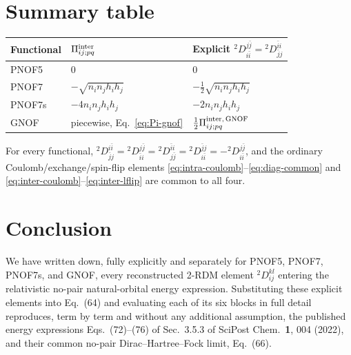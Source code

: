 \documentclass[11pt,a4paper]{article}
\newcommand{\Dtwo}{{}^2D}
\newcommand{\PiMat}{\Pi}
\newcommand{\hi}{h_i}
\newcommand{\hj}{h_j}
\begin{document}
\section{Summary table}
\label{sec:summary}

\begin{center}
\begin{tabular}{@{}lll@{}}
\toprule
Functional & $\PiMat^{\rm inter}_{ij;pq}$ & Explicit $\Dtwo^{j\bar j}_{i\bar i}=\Dtwo^{\bar ii}_{\bar jj}$ \\
\midrule
PNOF5 & $0$ & $0$ \\
PNOF7 & $-\sqrt{n_in_j\hi\hj}$ & $-\tfrac12\sqrt{n_in_j\hi\hj}$ \\
PNOF7s & $-4n_in_j\hi\hj$ & $-2n_in_j\hi\hj$ \\
GNOF & piecewise, Eq.~\eqref{eq:Pi-gnof} & $\tfrac12\PiMat^{\rm inter,\,GNOF}_{ij;pq}$ \\
\bottomrule
\end{tabular}
\end{center}
For every functional, $\Dtwo^{i\bar i}_{\bar jj}=\Dtwo^{j\bar j}_{\bar ii}
=\Dtwo^{\bar ii}_{j\bar j}=\Dtwo^{\bar jj}_{i\bar i}
=-\Dtwo^{j\bar j}_{i\bar i}$, and the ordinary
Coulomb/exchange/spin-flip elements
\eqref{eq:intra-coulomb}--\eqref{eq:diag-common} and
\eqref{eq:inter-coulomb}--\eqref{eq:inter-lflip} are common to all
four.

\section{Conclusion}
\label{sec:conclusion}

We have written down, fully explicitly and separately for PNOF5,
PNOF7, PNOF7s, and GNOF, every reconstructed 2-RDM element
$\Dtwo^{kl}_{ij}$ entering the relativistic no-pair natural-orbital
energy expression. Substituting these explicit elements into Eq.~(64)
and evaluating each of its six blocks in full detail reproduces,
term by term and without any additional assumption, the published
energy expressions Eqs.~(72)--(76) of Sec.~3.5.3 of SciPost Chem.\
\textbf{1}, 004 (2022), and their common no-pair Dirac--Hartree--Fock
limit, Eq.~(66).
\end{document}
